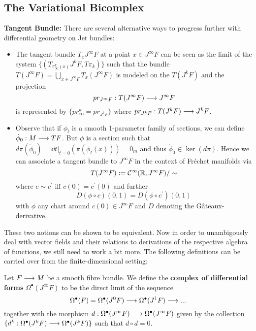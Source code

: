 \subsection{The Variational Bicomplex}

\textbf{Tangent Bundle:} There are several alternative ways to progress further with differential geometry on Jet bundles:
\begin{itemize}
  \item  The tangent bundle $T_xJ^\infty F$ at a point $x\in J^\infty F$ can be seen as the limit of the system $\{ (T_{\pi^k_\infty(x)}J^kF, T\pi_k) \}$ such that the bundle $T(J^\infty F) = \bigcup_{x\in J^\infty F} T_x(J^\infty F)$ is modeled on the $T(J^k F)$ and the projection
  $$ pr_{J^\infty F}: T(J^\infty F) \longrightarrow J^\infty F $$
  is represented by $\{ pr_\infty^k = pr_{J^kF} \}$ where $pr_{J^kF}: T(J^kF) \longrightarrow J^kF$.

  \item Observe that if $\phi_t$ is a smooth 1-parameter family of sections, we can define $\dot \phi_0: M \lra TF$. But $\phi$ is a section such that $d\pi(\dot \phi_0) = \dd{}{t} \big|_{t=0} (\pi(\phi_t(x))) = 0_m$ and thus $\dot \phi_0 \in \ker(d\pi)$. Hence we can associate a tangent bundle to $J^\infty F$ in the context of Fréchet manifolds via
  $$ T(J^\infty F) := \mathcal{C}^{\infty}(\mathbb{R}, J^\infty F) / \sim $$
  where $c\sim c^\prime$ iff $c(0) = c^\prime (0)$ and further
  $$ D(\phi\circ c) (0,1) = D(\phi \circ c^\prime) (0,1) $$
  with $\phi$ any chart around $c(0) \in J^\infty F$ and $D$ denoting the Gâteaux-derivative.
\end{itemize}

These two notions can be shown to be equivalent. Now in order to unambigously deal with vector fields and their relations to derivations of the respective algebra of functions, we still need to work a bit more. The following definitions can be carried over from the finite-dimensional setting:

\begin{definition}
Let $F\longrightarrow M$ be a smooth fibre bundle. We define the \textbf{complex of differential forms} $\Omega^\bullet(J^\infty F)$ to be the direct limit of the sequence
$$ \Omega^\bullet(F) = \Omega^\bullet(J^0F) \longrightarrow \Omega^\bullet(J^1F)\longrightarrow ... $$
together with the morphism $d:\Omega^\bullet(J^\infty F)\longrightarrow \Omega^\bullet(J^\infty F)$ given by the collection $\{ d^k: \Omega^\bullet(J^k F) \longrightarrow \Omega^\bullet(J^k F) \}$ such that $d\circ d = 0$.
\end{definition}

